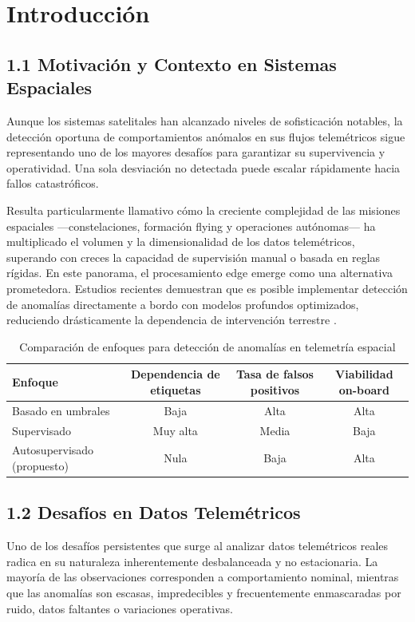 \section{Introducción}

\subsection{1.1 Motivación y Contexto en Sistemas Espaciales}

Aunque los sistemas satelitales han alcanzado niveles de sofisticación notables, la detección oportuna de comportamientos anómalos en sus flujos telemétricos sigue representando uno de los mayores desafíos para garantizar su supervivencia y operatividad. Una sola desviación no detectada puede escalar rápidamente hacia fallos catastróficos. 

Resulta particularmente llamativo cómo la creciente complejidad de las misiones espaciales —constelaciones, formación flying y operaciones autónomas— ha multiplicado el volumen y la dimensionalidad de los datos telemétricos, superando con creces la capacidad de supervisión manual o basada en reglas rígidas. En este panorama, el procesamiento edge emerge como una alternativa prometedora. Estudios recientes demuestran que es posible implementar detección de anomalías directamente a bordo con modelos profundos optimizados, reduciendo drásticamente la dependencia de intervención terrestre \cite{Goetze2026_Edge}.

\begin{table}[h]
\centering
\caption{Comparación de enfoques para detección de anomalías en telemetría espacial}
\label{tab:comparison}
\begin{tabular}{lccc}
\toprule
Enfoque & Dependencia de etiquetas & Tasa de falsos positivos & Viabilidad on-board \\
\midrule
Basado en umbrales & Baja & Alta & Alta \\
Supervisado & Muy alta & Media & Baja \\
Autosupervisado (propuesto) & Nula & Baja & Alta \\
\bottomrule
\end{tabular}
\end{table}

\subsection{1.2 Desafíos en Datos Telemétricos}

Uno de los desafíos persistentes que surge al analizar datos telemétricos reales radica en su naturaleza inherentemente desbalanceada y no estacionaria. La mayoría de las observaciones corresponden a comportamiento nominal, mientras que las anomalías son escasas, impredecibles y frecuentemente enmascaradas por ruido, datos faltantes o variaciones operativas. 

